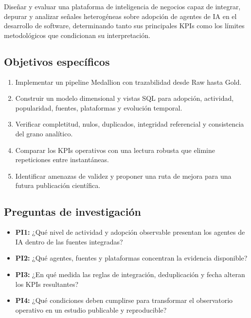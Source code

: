 \documentclass[12pt,a4paper]{article}
\begin{document}
Diseñar y evaluar una plataforma de inteligencia de negocios capaz de integrar, depurar y analizar señales heterogéneas sobre adopción de agentes de IA en el desarrollo de software, determinando tanto sus principales KPIs como los límites metodológicos que condicionan su interpretación.

\subsection{Objetivos específicos}

\begin{enumerate}[leftmargin=1.1cm]
  \item Implementar un pipeline Medallion con trazabilidad desde Raw hasta Gold.
  \item Construir un modelo dimensional y vistas SQL para adopción, actividad, popularidad, fuentes, plataformas y evolución temporal.
  \item Verificar completitud, nulos, duplicados, integridad referencial y consistencia del grano analítico.
  \item Comparar los KPIs operativos con una lectura robusta que elimine repeticiones entre instantáneas.
  \item Identificar amenazas de validez y proponer una ruta de mejora para una futura publicación científica.
\end{enumerate}

\subsection{Preguntas de investigación}

\begin{itemize}[leftmargin=1.0cm]
  \item \textbf{PI1:} ¿Qué nivel de actividad y adopción observable presentan los agentes de IA dentro de las fuentes integradas?
  \item \textbf{PI2:} ¿Qué agentes, fuentes y plataformas concentran la evidencia disponible?
  \item \textbf{PI3:} ¿En qué medida las reglas de integración, deduplicación y fecha alteran los KPIs resultantes?
  \item \textbf{PI4:} ¿Qué condiciones deben cumplirse para transformar el observatorio operativo en un estudio publicable y reproducible?
\end{itemize}

\end{document}
